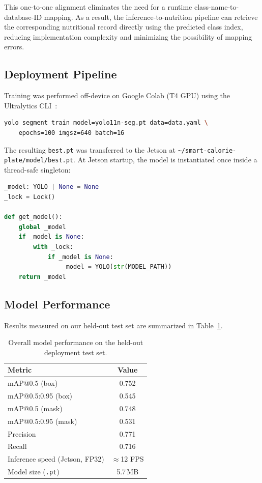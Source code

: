 \documentclass[11pt,a4paper]{article}
\begin{document}
This one-to-one alignment eliminates the need for a runtime class-name-to-database-ID mapping. As a result, the inference-to-nutrition pipeline can retrieve the corresponding nutritional record directly using the predicted class index, reducing implementation complexity and minimizing the possibility of mapping errors.

\subsection{Deployment Pipeline}

Training was performed off-device on Google Colab (T4 GPU) using the Ultralytics CLI~\cite{ultralytics}:

\begin{lstlisting}[language=bash]
yolo segment train model=yolo11n-seg.pt data=data.yaml \
    epochs=100 imgsz=640 batch=16
\end{lstlisting}

The resulting \texttt{best.pt} was transferred to the Jetson at \texttt{\textasciitilde/smart-calorie-plate/model/best.pt}. At Jetson startup, the model is instantiated once inside a thread-safe singleton:

\begin{lstlisting}[language=Python]
_model: YOLO | None = None
_lock = Lock()

def get_model():
    global _model
    if _model is None:
        with _lock:
            if _model is None:
                _model = YOLO(str(MODEL_PATH))
    return _model
\end{lstlisting}

\subsection{Model Performance}

Results measured on our held-out test set are summarized in Table~\ref{tab:performance}.

\begin{table}[H]
  \centering
  \caption{Overall model performance on the held-out deployment test set.}
  \label{tab:performance}
  \begin{tabular}{lc}
    \toprule
    \textbf{Metric} & \textbf{Value} \\
    \midrule
    mAP@0.5 (box)                  & 0.752 \\
    mAP@0.5:0.95 (box)             & 0.545 \\
    mAP@0.5 (mask)                 & 0.748 \\
    mAP@0.5:0.95 (mask)            & 0.531 \\
    Precision                      & 0.771 \\
    Recall                         & 0.716 \\
    Inference speed (Jetson, FP32) & $\approx$12 FPS \\
    Model size (\texttt{.pt})      & 5.7\,MB \\
    \bottomrule
  \end{tabular}
\end{table}
\end{document}
